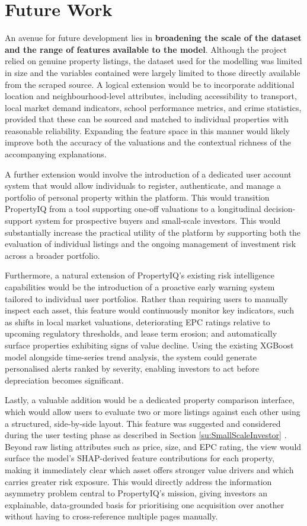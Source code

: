\section{Future Work}
\label{se:FutureWork}

An avenue for future development lies in \textbf{broadening the scale of the dataset and the range of features available to the model}. Although the project relied on genuine property listings, the dataset used for the modelling was limited in size and the variables contained were largely limited to those directly available from the scraped source. A logical extension would be to incorporate additional location and neighbourhood-level attributes, including accessibility to transport, local market demand indicators, school performance metrics, and crime statistics, provided that these can be sourced and matched to individual properties with reasonable reliability. Expanding the feature space in this manner would likely improve both the accuracy of the valuations and the contextual richness of the accompanying explanations.

A further extension would involve the introduction of a dedicated user account system that would allow individuals to register, authenticate, and manage a portfolio of personal property within the platform. This would transition PropertyIQ from a tool supporting one-off valuations to a longitudinal decision-support system for prospective buyers and small-scale investors. This would substantially increase the practical utility of the platform by supporting both the evaluation of individual listings and the ongoing management of investment risk across a broader portfolio.

Furthermore, a natural extension of PropertyIQ's existing risk intelligence capabilities would be the introduction of a proactive early warning system tailored to individual user portfolios. Rather than requiring users to manually inspect each asset, this feature would continuously monitor key indicators, such as shifts in local market valuations, deteriorating EPC ratings relative to upcoming regulatory thresholds, and lease term erosion; and automatically surface properties exhibiting signs of value decline. Using the existing XGBoost model alongside time-series trend analysis, the system could generate personalised alerts ranked by severity, enabling investors to act before depreciation becomes significant.

Lastly, a valuable addition would be a dedicated property comparison interface, which would allow users to evaluate two or more listings against each other using a structured, side-by-side layout. This feature was suggested and considered during the user testing phase as described in Section \ref{su:SmallScaleInvestor} . Beyond raw listing attributes such as price, size, and EPC rating, the view would surface the model's SHAP-derived feature contributions for each property, making it immediately clear which asset offers stronger value drivers and which carries greater risk exposure. This would directly address the information asymmetry problem central to PropertyIQ's mission, giving investors an explainable, data-grounded basis for prioritising one acquisition over another without having to cross-reference multiple pages manually.